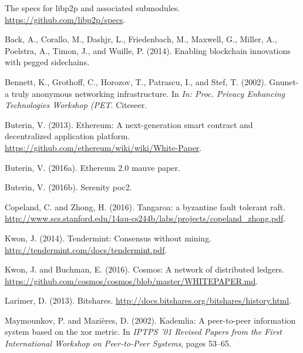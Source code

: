 \documentclass[t,usepdftitle=false]{beamer}
\begin{document}
\begin{thebibliography}{}

The specs for libp2p and associated submodules.
\newblock \url{https://github.com/libp2p/specs}.

Back, A., Corallo, M., Dashjr, L., Friedenbach, M., Maxwell, G., Miller, A.,
  Poelstra, A., Timon, J., and Wuille, P. (2014).
\newblock Enabling blockchain innovations with pegged sidechains.

Bennett, K., Grothoff, C., Horozov, T., Patrascu, I., and Stef, T. (2002).
\newblock Gnunet-a truly anonymous networking infrastructure.
\newblock In {\em In: Proc. Privacy Enhancing Technologies Workshop (PET}.
  Citeseer.

Buterin, V. (2013).
\newblock Ethereum: A next-generation smart contract and decentralized
  application platform.
\newblock \url{https://github.com/ethereum/wiki/wiki/White-Paper}.

Buterin, V. (2016a).
\newblock Ethereum 2.0 mauve paper.

Buterin, V. (2016b).
\newblock Serenity poc2.

Copeland, C. and Zhong, H. (2016).
\newblock Tangaroa: a byzantine fault tolerant raft.
\newblock
  \url{http://www.scs.stanford.edu/14au-cs244b/labs/projects/copeland_zhong.pdf}.

Kwon, J. (2014).
\newblock Tendermint: Consensus without mining.
\newblock \url{http://tendermint.com/docs/tendermint.pdf}.

Kwon, J. and Buchman, E. (2016).
\newblock Cosmos: A network of distributed ledgers.
\newblock \url{https://github.com/cosmos/cosmos/blob/master/WHITEPAPER.md}.

Larimer, D. (2013).
\newblock Bitshares.
\newblock \url{http://docs.bitshares.org/bitshares/history.html}.

Maymounkov, P. and Mazi\`eres, D. (2002).
\newblock Kademlia: A peer-to-peer information system based on the xor metric.
\newblock In {\em IPTPS '01 Revised Papers from the First International
  Workshop on Peer-to-Peer Systems}, pages 53--65.


\end{thebibliography}
\end{document}
